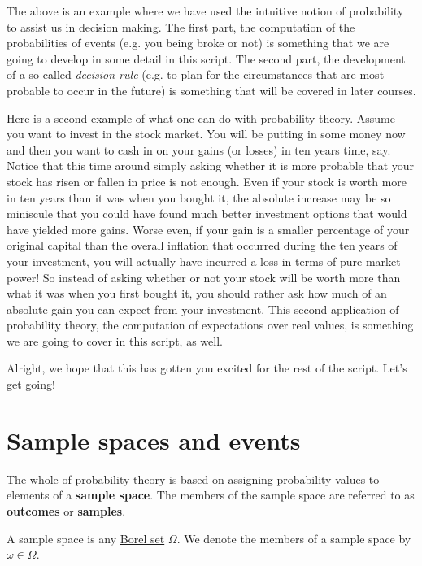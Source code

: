 The above is an example where we have used the intuitive notion of probability to assist us in decision
making. The first part, the computation of the probabilities of events (e.g. you being broke or not)
is something that we are going to develop in some detail in this script. The second part, the development
of a so-called \textit{decision rule} (e.g. to plan for the circumstances that are most probable to 
occur in the future) is something that will be covered in later courses.

Here is a second example of what one can do with probability theory. Assume you want to invest in the 
stock market. You will be putting in some money now and then you want to cash in on your gains (or losses)
in ten years time, say. Notice that this time around simply asking whether it is more probable that your
stock has risen or fallen in price is not enough. Even if your stock is worth more in ten years than it
was when you bought it, the absolute increase may be so miniscule that you could have found much better
investment options that would have yielded more gains. Worse even, if your gain is a smaller percentage
of your original capital than the overall inflation that occurred during the ten years of your investment,
you will actually have incurred a loss in terms of pure market power! So instead of asking whether
or not your stock will be worth more than what it was when you first bought it, you should rather
ask how much of an absolute gain you can expect from your investment. This second application of probability
theory, the computation of expectations over real values, is something we are going to cover in this
script, as well.

Alright, we hope that this has gotten you excited for the rest of the script. Let's get going!

\section{Sample spaces and events}
The whole of probability theory is based on assigning probability values to elements of a 
\textbf{sample space}. The members of the sample space are referred to as \textbf{outcomes} or \textbf{samples}.

\begin{Definition} A sample space is any \href{http://en.wikipedia.org/wiki/Borel_set}{Borel set} 
$ \Omega $. We denote the members of a sample space by $ \omega \in \Omega $.
\end{Definition}

